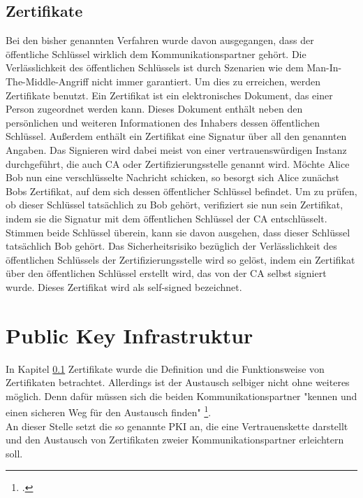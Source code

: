 \documentclass  [paper=a4,
				fontsize=12pt,
				listof=totoc,
				bibliography=totoc
				]{scrreprt}
\begin{document}
			\subsection{Zertifikate}\label{chp: zertifikate}
				Bei den bisher genannten Verfahren wurde davon ausgegangen, dass der öffentliche Schlüssel wirklich dem Kommunikationspartner gehört. Die Verlässlichkeit des öffentlichen Schlüssels ist durch Szenarien wie dem Man-In-The-Middle-Angriff nicht immer garantiert. Um dies zu erreichen, werden Zertifikate benutzt.
				Ein Zertifikat ist ein elektronisches Dokument, das einer Person zugeordnet werden kann. Dieses Dokument enthält neben den persönlichen und weiteren Informationen des Inhabers dessen öffentlichen Schlüssel. Außerdem enthält ein Zertifikat eine Signatur über all den genannten Angaben. Das Signieren wird dabei meist von einer vertrauenswürdigen Instanz durchgeführt, die auch \ac{CA} oder Zertifizierungsstelle genannt wird.
				Möchte Alice Bob nun eine verschlüsselte Nachricht schicken, so besorgt sich Alice zunächst Bobs Zertifikat, auf dem sich dessen öffentlicher Schlüssel befindet. Um zu prüfen, ob dieser Schlüssel tatsächlich zu Bob gehört, verifiziert sie nun sein Zertifikat, indem sie die Signatur mit dem öffentlichen Schlüssel der \ac{CA} entschlüsselt. Stimmen beide Schlüssel überein, kann sie davon ausgehen, dass dieser Schlüssel tatsächlich Bob gehört.
				Das Sicherheitsrisiko bezüglich der Verlässlichkeit des öffentlichen Schlüssels der Zertifizierungsstelle wird so gelöst, indem ein Zertifikat über den öffentlichen Schlüssel erstellt wird, das von der CA selbst signiert wurde. Dieses Zertifikat wird als self-signed bezeichnet.
	
		\section{Public Key Infrastruktur}
			In Kapitel \ref*{chp: zertifikate} Zertifikate wurde die Definition und die Funktionsweise von Zertifikaten betrachtet. Allerdings ist der Austausch selbiger nicht ohne weiteres möglich. Denn dafür müssen sich die beiden Kommunikationspartner "kennen und einen sicheren Weg für den Austausch finden" \footcite{BSI}.\medskip\\
			
			An dieser Stelle setzt die so genannte \ac{PKI} an, die eine Vertrauenskette darstellt und den Austausch von Zertifikaten zweier Kommunikationspartner erleichtern soll.
			\medskip\\
			
\end{document}
